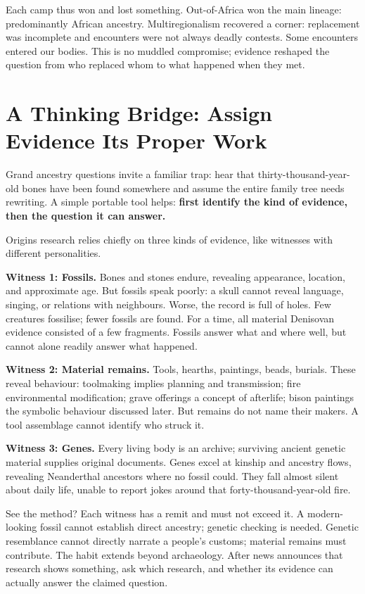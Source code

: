 Each camp thus won and lost something. Out-of-Africa won the main lineage: predominantly African ancestry. Multiregionalism recovered a corner: replacement was incomplete and encounters were not always deadly contests. Some encounters entered our bodies. This is no muddled compromise; evidence reshaped the question from who replaced whom to what happened when they met.

\section[Thinking Bridge: Evidence Has Jobs]{A Thinking Bridge: Assign Evidence Its Proper Work}
Grand ancestry questions invite a familiar trap: hear that thirty-thousand-year-old bones have been found somewhere and assume the entire family tree needs rewriting. A simple portable tool helps: \textbf{first identify the kind of evidence, then the question it can answer.}

Origins research relies chiefly on three kinds of evidence, like witnesses with different personalities.

\textbf{Witness 1: Fossils.} Bones and stones endure, revealing appearance, location, and approximate age. But fossils speak poorly: a skull cannot reveal language, singing, or relations with neighbours. Worse, the record is full of holes. Few creatures fossilise; fewer fossils are found. For a time, all material Denisovan evidence consisted of a few fragments. Fossils answer what and where well, but cannot alone readily answer what happened.

\textbf{Witness 2: Material remains.} Tools, hearths, paintings, beads, burials. These reveal behaviour: toolmaking implies planning and transmission; fire environmental modification; grave offerings a concept of afterlife; bison paintings the symbolic behaviour discussed later. But remains do not name their makers. A tool assemblage cannot identify who struck it.

\textbf{Witness 3: Genes.} Every living body is an archive; surviving ancient genetic material supplies original documents. Genes excel at kinship and ancestry flows, revealing Neanderthal ancestors where no fossil could. They fall almost silent about daily life, unable to report jokes around that forty-thousand-year-old fire.

See the method? Each witness has a remit and must not exceed it. A modern-looking fossil cannot establish direct ancestry; genetic checking is needed. Genetic resemblance cannot directly narrate a people's customs; material remains must contribute. The habit extends beyond archaeology. After news announces that research shows something, ask which research, and whether its evidence can actually answer the claimed question.

